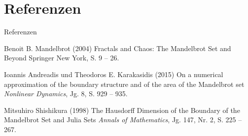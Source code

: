 \section{Referenzen}

\begin{frame}{Referenzen}
    \footnotesize{
        \begin{thebibliography}{99}
             Benoit B. Mandelbrot (2004)
            \newblock Fractals and Chaos: The Mandelbrot Set and Beyond
            \newblock Springer New York, S. 9 -- 26.

             Ioannis Andreadis und Theodoros E. Karakasidis  (2015)
            \newblock On a numerical approximation of the boundary structure and of the area of the Mandelbrot set
            \newblock \emph{Nonlinear Dynamics}, Jg. 8, S. 929 -- 935.

             Mitsuhiro Shishikura  (1998)
            \newblock The Hausdorff Dimension of the Boundary of the Mandelbrot Set and Julia Sets
            \newblock \emph{Annals of Mathematics}, Jg. 147, Nr. 2, S. 225 -- 267.
        \end{thebibliography}
    }
\end{frame}